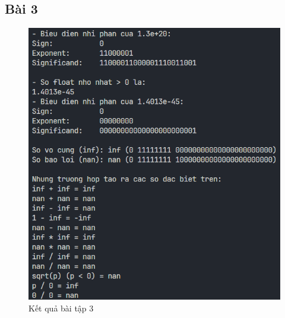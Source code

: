 \documentclass[a4paper,12pt]{report}
\begin{document}
\subsection{Bài 3}
\begin{figure}[!ht]
	\centering
	\includegraphics[width=0.7\linewidth]{imgs/3.png}
	\caption{Kết quả bài tập 3}
\end{figure}
\end{document}
